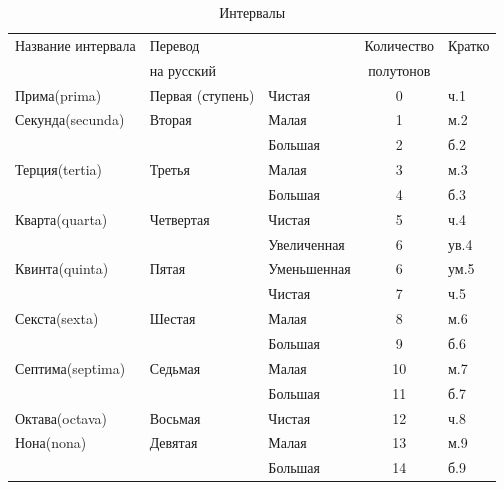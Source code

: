 \begin{table}[!ht]
    \caption{Интервалы}
    \label{t:harmony:interval:names}
    \centering
    \begin{tabular}{l|l|l|c|l}
        \hline\hline
        Название интервала & Перевод            &               & Количество  & Кратко  \\
                           & на русский         &               & полутонов   &         \\
        \hline\hline
        Прима(prima)       & Первая (ступень)   & Чистая        & 0                 & ч.1 \\
        Секунда(secunda)   & Вторая             & Малая         & 1                 & м.2 \\
                           &                    & Большая       & 2                 & б.2 \\
        Терция(tertia)     & Третья             & Малая         & 3                 & м.3 \\
                           &                    & Большая       & 4                 & б.3 \\
        Кварта(quarta)     & Четвертая          & Чистая        & 5                 & ч.4 \\
                           &                    & Увеличенная   & 6                 & ув.4\\
        Квинта(quinta)     & Пятая              & Уменьшенная   & 6                 & ум.5\\
                           &                    & Чистая        & 7                 & ч.5 \\
        Секста(sexta)      & Шестая             & Малая         & 8                 & м.6 \\
                           &                    & Большая       & 9                 & б.6 \\
        Септима(septima)   & Седьмая            & Малая         & 10                & м.7 \\
                           &                    & Большая       & 11                & б.7 \\
        Октава(octava)     & Восьмая            & Чистая        & 12                & ч.8 \\
        \hline\hline
        Нона(nona)         & Девятая            & Малая         & 13                & м.9  \\
                           &                    & Большая       & 14                & б.9  \\

\end{tabular}
\end{table}
